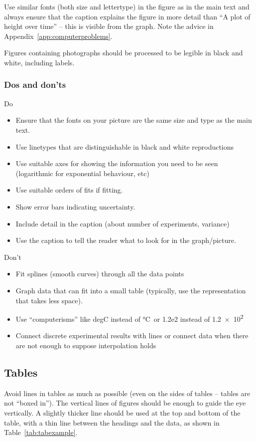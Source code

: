 \documentclass[a5paper, 10pt]{article}
\begin{document}
Use similar fonts (both size and lettertype) in the figure as in the
main text and always ensure that the caption explains the figure in
more detail than ``A plot of height over time'' -- this is visible from the
graph.  Note the advice in Appendix~\ref{app:computerproblems}.

Figures containing photographs should be processed to be legible in
black and white, including labels.

\subsubsection*{Dos and don'ts}
Do
\begin{itemize}
\item Ensure that the fonts on your picture are the same size and type as
  the main text.
\item Use linetypes that are distinguishable in black and white
  reproductions
\item Use suitable axes for showing the information you need to be seen
  (logarithmic for exponential behaviour, etc)
\item Use suitable orders of fits if fitting.
\item Show error bars indicating uncertainty.
\item Include detail in the caption (about number of experiments,
  variance)
\item Use the caption to tell the reader what to look for in the graph/picture.
\end{itemize}

Don't
\begin{itemize}
\item Fit splines (smooth curves) through all the data points
\item Graph data that can fit into a small table (typically, use the
  representation that takes less space).
\item Use ``computerisms'' like degC instead of \si{\celsius}\ or 1.2e2
  instead of \num{1.2e2} 
\item Connect discrete experimental results with lines or connect data when there are not enough to suppose interpolation holds
\end{itemize}

\subsection{Tables}
Avoid lines in tables as much as possible (even on the sides
of tables -- tables are not ``boxed in'').  The vertical
lines of figures should be enough to guide the eye vertically.  A
slightly thicker line should be used at the top and bottom of the
table, with a thin line between the headings and the data, as shown in
Table~\ref{tab:tabexample}.
\end{document}
